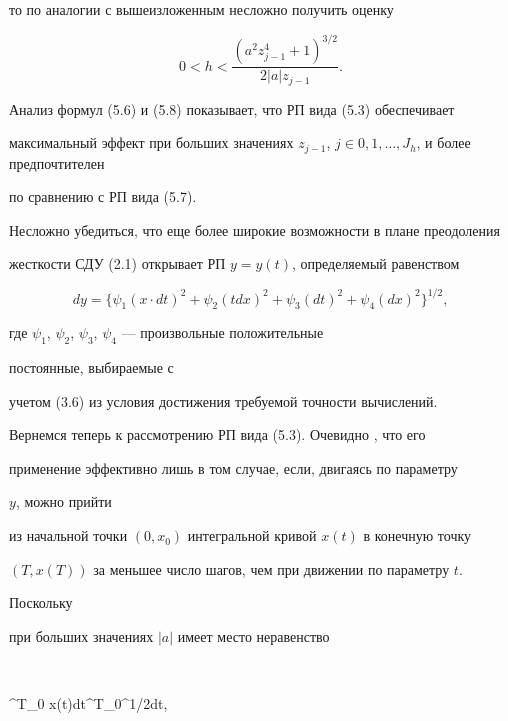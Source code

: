 то по аналогии с вышеизложенным несложно получить оценку 


\begin{equation} 


0<h<\frac{(a^2z^4_{j-1}+1)^{3/2}}{2|a|z_{j-1}}. 


\end{equation} 


 


Анализ формул (5.6) и (5.8) показывает, что РП вида (5.3) обеспечивает 


максимальный эффект при больших значениях $z_{j-1}$, $j\in 


0,1,\dotsc,J_h$, и более предпочтителен 


по сравнению с РП вида (5.7). 


 


Несложно убедиться, что еще более широкие возможности в плане преодоления 


жесткости СДУ (2.1) открывает РП $y=y(t)$, определяемый равенством 


$$ 


dy=\{\psi_1(x\cdot dt)^2+\psi_2(t dx)^2+\psi_3(dt)^2+ 


\psi_4(dx)^2\}^{1/2}, 


$$ 


где $\psi_1$, $\psi_2$, $\psi_3$, $\psi_4$ --- произвольные положительные 


постоянные, выбираемые с 


учетом (3.6) из условия достижения требуемой точности вычислений. 


 


Вернемся теперь к рассмотрению РП вида (5.3). Очевидно , что его 


применение эффективно лишь в том случае, если, двигаясь по параметру 


$y$, можно прийти 


из начальной точки $(0,x_0)$ интегральной кривой $x(t)$ в конечную точку 


$(T,x(T))$ за меньшее число шагов, чем при движении по параметру $t$. 


Поскольку 


при больших значениях $|a|$ имеет место неравенство 


$$ 


\int^T_0 x(t)dt\ll\int^T_0^{1/2}dt, 


